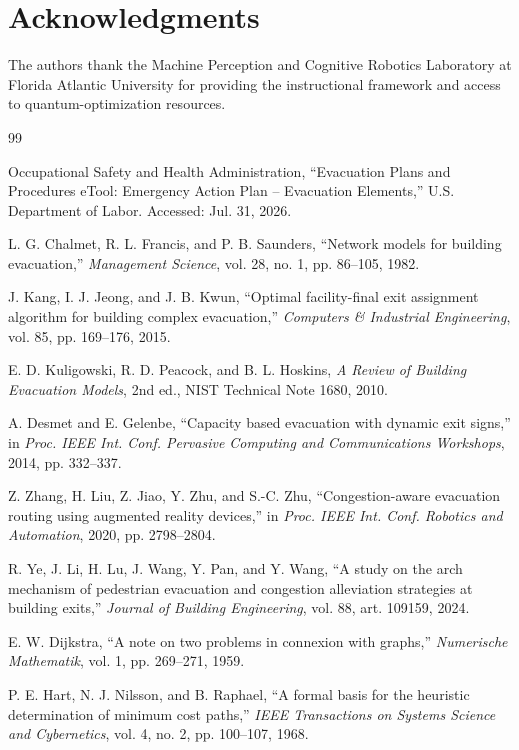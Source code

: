 \documentclass[11pt]{article}
\begin{document}
\section*{Acknowledgments}
The authors thank the Machine Perception and Cognitive Robotics Laboratory at Florida Atlantic University for providing the instructional framework and access to quantum-optimization resources.

\begin{thebibliography}{99}

 Occupational Safety and Health Administration, ``Evacuation Plans and Procedures eTool: Emergency Action Plan -- Evacuation Elements,'' U.S. Department of Labor. Accessed: Jul. 31, 2026.

 L. G. Chalmet, R. L. Francis, and P. B. Saunders, ``Network models for building evacuation,'' \textit{Management Science}, vol. 28, no. 1, pp. 86--105, 1982.

 J. Kang, I. J. Jeong, and J. B. Kwun, ``Optimal facility-final exit assignment algorithm for building complex evacuation,'' \textit{Computers \& Industrial Engineering}, vol. 85, pp. 169--176, 2015.

 E. D. Kuligowski, R. D. Peacock, and B. L. Hoskins, \textit{A Review of Building Evacuation Models}, 2nd ed., NIST Technical Note 1680, 2010.

 A. Desmet and E. Gelenbe, ``Capacity based evacuation with dynamic exit signs,'' in \textit{Proc. IEEE Int. Conf. Pervasive Computing and Communications Workshops}, 2014, pp. 332--337.

 Z. Zhang, H. Liu, Z. Jiao, Y. Zhu, and S.-C. Zhu, ``Congestion-aware evacuation routing using augmented reality devices,'' in \textit{Proc. IEEE Int. Conf. Robotics and Automation}, 2020, pp. 2798--2804.

 R. Ye, J. Li, H. Lu, J. Wang, Y. Pan, and Y. Wang, ``A study on the arch mechanism of pedestrian evacuation and congestion alleviation strategies at building exits,'' \textit{Journal of Building Engineering}, vol. 88, art. 109159, 2024.

 E. W. Dijkstra, ``A note on two problems in connexion with graphs,'' \textit{Numerische Mathematik}, vol. 1, pp. 269--271, 1959.

 P. E. Hart, N. J. Nilsson, and B. Raphael, ``A formal basis for the heuristic determination of minimum cost paths,'' \textit{IEEE Transactions on Systems Science and Cybernetics}, vol. 4, no. 2, pp. 100--107, 1968.


\end{thebibliography}
\end{document}
